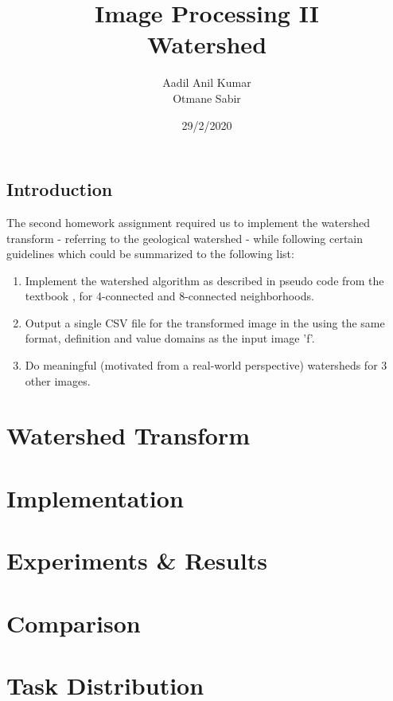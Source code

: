 \documentclass{article}
\begin{document}
\title{Image Processing II\\
 Watershed}
\author{Aadil Anil Kumar \\
Otmane Sabir
}
\date{29/2/2020}
\maketitle
\vspace{10mm}
\begin{center}
\section*{Introduction}
\large
The second homework assignment required us to implement the watershed transform - referring to the geological watershed - while following certain guidelines which could be summarized to the following list: 
\vspace{7mm}
\begin{enumerate}
    \item Implement the watershed algorithm as described in pseudo code from the textbook \cite{soille2013morphological}, for 4-connected and 8-connected neighborhoods.
    \item Output a single CSV file for the transformed image in the using the same format, definition and value domains as the input image 'f'.
    \item Do meaningful (motivated from a real-world perspective) watersheds for 3 other images.
\end{enumerate}
\end{center}
\newpage

\tableofcontents

\newpage

\section{Watershed Transform}


\section{Implementation}


\section{Experiments \& Results}


\section{Comparison}


\section{Task Distribution}

\newpage
\nocite{*}
\printbibliography
\end{document}

